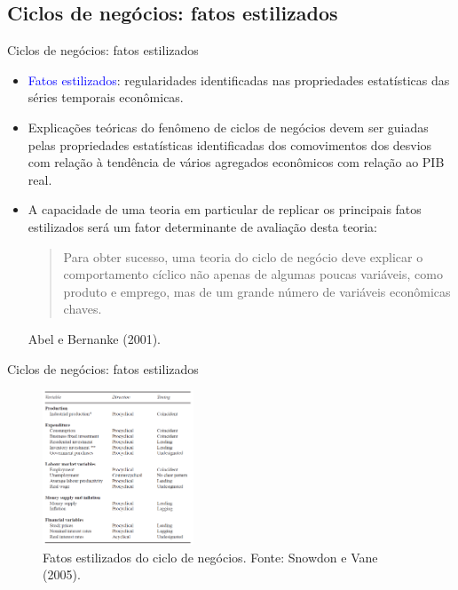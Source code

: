 \documentclass[10pt]{beamer}
\begin{document}
\subsection{Ciclos de negócios: fatos estilizados}
\begin{frame}{Ciclos de negócios: fatos estilizados}
    \begin{itemize}
        \item \textcolor{blue}{Fatos estilizados}: regularidades identificadas nas propriedades estatísticas das séries temporais econômicas.
        \bigskip
        \item Explicações teóricas do fenômeno de ciclos de negócios devem ser guiadas pelas propriedades estatísticas identificadas dos comovimentos dos desvios com relação à tendência de vários agregados econômicos com relação ao PIB real.
        \bigskip
        \item A capacidade de uma teoria em particular de replicar os principais fatos estilizados será um fator determinante de avaliação desta teoria:
        \begin{quote}
            Para obter sucesso, uma teoria do ciclo de negócio deve explicar o comportamento cíclico não apenas de algumas poucas variáveis, como produto e emprego, mas de um grande número de variáveis econômicas chaves.
        \end{quote}
        \begin{flushright}
            Abel e Bernanke (2001).
        \end{flushright}
    \end{itemize}
\end{frame}

\begin{frame}{Ciclos de negócios: fatos estilizados}
    \begin{figure}
        \centering
        \includegraphics[width=0.4\textwidth]{./figures/aula14_fig5.PNG}
        \caption{Fatos estilizados do ciclo de negócios. Fonte: Snowdon e Vane (2005).}
        \label{fig5}
    \end{figure}
\end{frame}
\end{document}

